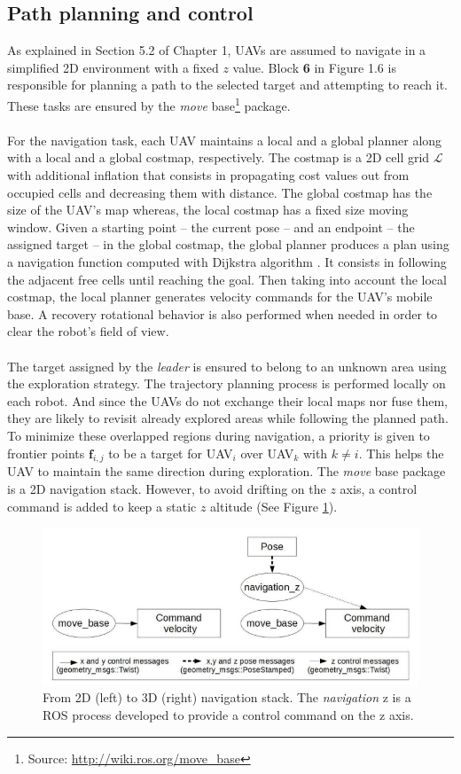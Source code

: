 \documentclass[11pt,openany]{book}
\begin{document}
\subsection{Path planning and control}
As explained in Section 5.2 of Chapter 1, UAVs are assumed to navigate in a simplified 2D environment with a fixed $z$ value. Block \textbf{6} in Figure 1.6 is responsible for planning a path to the selected target and attempting to reach it. These tasks are ensured by the \textit{move} base\footnote{Source: \url{http://wiki.ros.org/move_base}} package.\\\\
For the navigation task, each UAV maintains a local and a global planner along with a local and a global costmap, respectively. The costmap is a 2D cell grid $\mathcal{L}$ with additional inﬂation that consists in propagating cost values out from occupied cells and decreasing them with distance. The global costmap has the size of the UAV’s map whereas, the local costmap has a fixed size moving window. Given a starting point – the current pose – and an endpoint – the assigned target – in the global costmap, the global planner produces a plan using a navigation function computed with Dijkstra algorithm \cite{dijkstra1959note}. It consists in following the adjacent free cells until reaching the goal. Then taking into account the local costmap, the local planner generates velocity commands for the UAV’s mobile base. A recovery rotational behavior is also performed when needed in order to clear the robot’s field of view.\\\\
The target assigned by the \textit{leader} is ensured to belong to an unknown area using the exploration strategy. The trajectory planning process is performed locally on each robot. And since the UAVs do not exchange their local maps nor fuse them, they are likely to revisit already explored areas while following the planned path. To minimize these overlapped regions during navigation, a priority is given to frontier points $\mathbf{f}_{i,j}$ to be a target for UAV$_i$ over UAV$_k$ with $k \neq i$. This helps the UAV to maintain the same direction during exploration. The \textit{move} base package is a 2D navigation stack. However, to avoid drifting on the $z$ axis, a control command is added to keep a static $z$ altitude (See Figure \ref{fig:3.10}).
\begin{figure}[H]
    \centering
    \includegraphics[scale=0.4]{assets/3_10.png}
    \caption{From 2D (left) to 3D (right) navigation stack. The \textit{navigation} z is a ROS process developed to provide a control command on the z axis.}
    \label{fig:3.10}
\end{figure}
\end{document}
